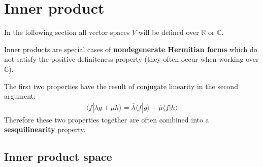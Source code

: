 \section{Inner product}\label{linalgebra:innerproduct}

    In the following section all vector spaces $V$ will be defined over $\mathbb{R}$ or $\mathbb{C}$.

    \begin{remark}\label{linalgebra:NDH_form}
        Inner products are special cases of \textbf{nondegenerate Hermitian forms} which do not satisfy the positive-definiteness property (they often occur when working over $\mathbb{C}$).
    \end{remark}

    \begin{result}
        The first two properties have the result of conjugate linearity in the second argument:
        \begin{gather}
            \langle f|\lambda g + \mu h \rangle = \overline{\lambda}\langle f|g \rangle + \overline{\mu}\langle f|h \rangle
        \end{gather}
        Therefore these two properties together are often combined into a \textbf{sesquilinearity} property.
    \end{result}

\subsection{Inner product space}


